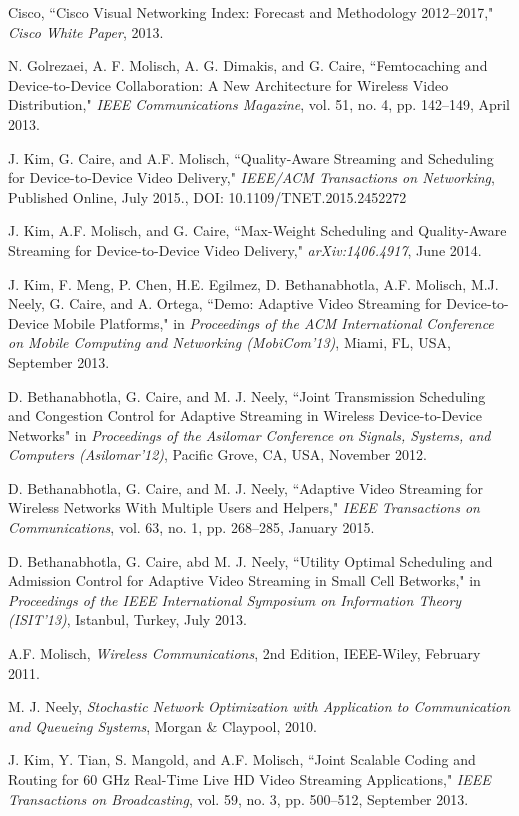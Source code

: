 \documentclass[conference]{IEEEtran}
\begin{document}
\begin{thebibliography}{1}


 Cisco, ``Cisco Visual Networking Index: Forecast and Methodology 2012--2017," \textit{Cisco White Paper}, 2013.


 N. Golrezaei, A. F. Molisch, A. G. Dimakis, and G. Caire, ``Femtocaching and Device-to-Device Collaboration: A New Architecture for Wireless Video Distribution," \textit{IEEE Communications Magazine}, vol. 51, no. 4, pp. 142--149, April 2013.

 J. Kim, G. Caire, and A.F. Molisch, ``Quality-Aware Streaming and Scheduling for Device-to-Device Video Delivery," \textit{IEEE/ACM Transactions on Networking}, Published Online, July 2015., DOI: 10.1109/TNET.2015.2452272

 J. Kim, A.F. Molisch, and G. Caire, ``Max-Weight Scheduling and Quality-Aware Streaming for Device-to-Device Video Delivery," \textit{arXiv:1406.4917}, June 2014.

J. Kim, F. Meng, P. Chen, H.E. Egilmez, D. Bethanabhotla, A.F. Molisch, M.J. Neely, G. Caire, and A. Ortega, ``Demo: Adaptive Video Streaming for Device-to-Device Mobile Platforms," in \textit{Proceedings of the ACM International Conference on Mobile Computing and Networking (MobiCom'13)}, Miami, FL, USA, September 2013.

 D. Bethanabhotla, G. Caire, and M. J. Neely, ``Joint Transmission Scheduling and Congestion Control for Adaptive Streaming in Wireless Device-to-Device Networks" in \textit{Proceedings of the Asilomar Conference on Signals, Systems, and Computers (Asilomar'12)}, Pacific Grove, CA, USA, November 2012.

 D. Bethanabhotla, G. Caire, and M. J. Neely, ``Adaptive Video Streaming for Wireless Networks With Multiple Users and Helpers," \textit{IEEE Transactions on Communications}, vol. 63, no. 1, pp. 268--285, January 2015.

 D. Bethanabhotla, G. Caire, abd M. J. Neely, ``Utility Optimal Scheduling and Admission Control for Adaptive Video Streaming in Small Cell Betworks," in \textit{Proceedings of the IEEE International Symposium on Information Theory (ISIT'13)}, Istanbul, Turkey, July 2013.

 A.F. Molisch, \textit{Wireless Communications}, 2nd Edition, IEEE-Wiley, February 2011.

 M. J. Neely, \textit{Stochastic Network Optimization with Application to Communication and Queueing Systems}, Morgan \& Claypool, 2010.

J. Kim, Y. Tian, S. Mangold, and A.F. Molisch, ``Joint Scalable Coding and Routing for 60 GHz Real-Time Live HD Video Streaming Applications," \textit{IEEE Transactions on Broadcasting}, vol. 59, no. 3, pp. 500--512, September 2013.


\end{thebibliography}
\end{document}
